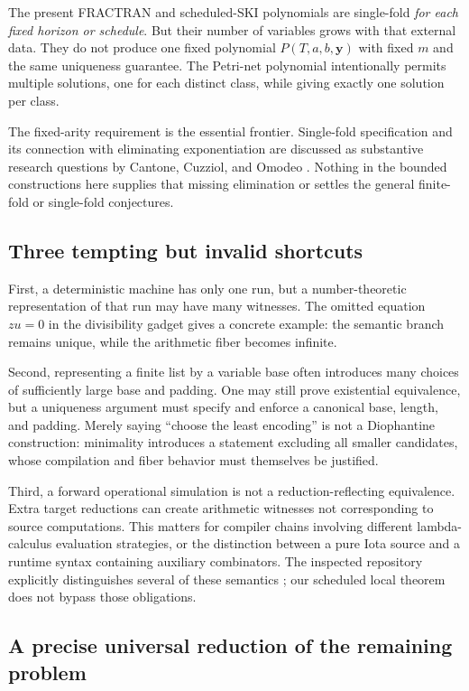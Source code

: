 \documentclass[11pt,a4paper]{article}
\theoremstyle{definition}
\theoremstyle{remark}
\begin{document}
The present FRACTRAN and scheduled-SKI polynomials are single-fold \emph{for each fixed horizon or schedule}. But their number of variables grows with that external data. They do not produce one fixed polynomial $P(T,a,b,\mathbf y)$ with fixed $m$ and the same uniqueness guarantee. The Petri-net polynomial intentionally permits multiple solutions, one for each distinct class, while giving exactly one solution per class.

The fixed-arity requirement is the essential frontier. Single-fold specification and its connection with eliminating exponentiation are discussed as substantive research questions by Cantone, Cuzziol, and Omodeo \cite{cco2024}. Nothing in the bounded constructions here supplies that missing elimination or settles the general finite-fold or single-fold conjectures.

\subsection{Three tempting but invalid shortcuts}
First, a deterministic machine has only one run, but a number-theoretic representation of that run may have many witnesses. The omitted equation $zu=0$ in the divisibility gadget gives a concrete example: the semantic branch remains unique, while the arithmetic fiber becomes infinite.

Second, representing a finite list by a variable base often introduces many choices of sufficiently large base and padding. One may still prove existential equivalence, but a uniqueness argument must specify and enforce a canonical base, length, and padding. Merely saying ``choose the least encoding'' is not a Diophantine construction: minimality introduces a statement excluding all smaller candidates, whose compilation and fiber behavior must themselves be justified.

Third, a forward operational simulation is not a reduction-reflecting equivalence. Extra target reductions can create arithmetic witnesses not corresponding to source computations. This matters for compiler chains involving different lambda-calculus evaluation strategies, or the distinction between a pure Iota source and a runtime syntax containing auxiliary combinators. The inspected repository explicitly distinguishes several of these semantics \cite{repo-cl}; our scheduled local theorem does not bypass those obligations.

\subsection{A precise universal reduction of the remaining problem}
\end{document}

